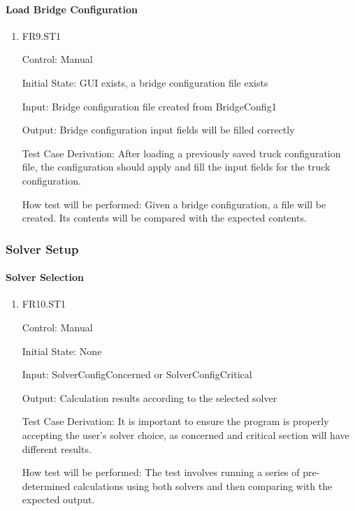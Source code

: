 \documentclass[12pt, titlepage]{article}
\begin{document}
\paragraph{Load Bridge Configuration}

\begin{enumerate}
  
  \item{FR9.ST1\\}
  
  Control: Manual
  
  Initial State: GUI exists, a bridge configuration file exists
  
  Input: Bridge configuration file created from BridgeConfig1
  
  Output: Bridge configuration input fields will be filled correctly
  
  Test Case Derivation: After loading a previously saved truck configuration file, the configuration
  should apply and fill the input fields for the truck configuration.
  
  How test will be performed: Given a bridge configuration, a file will be created. Its contents
  will be compared with the expected contents.

\end{enumerate}

\subsubsection{Solver Setup}

\paragraph{Solver Selection}

\begin{enumerate}

  \item{FR10.ST1\\}

  Control: Manual
            
  Initial State: None
            
  Input: SolverConfigConcerned or SolverConfigCritical
            
  Output: Calculation results according to the selected solver

  Test Case Derivation: It is important to ensure the program is properly accepting the user's solver choice, as concerned and critical section will have different results.

  How test will be performed: The test involves running a series of pre-determined calculations using both solvers and then comparing with the expected output. 
					
\end{enumerate}
\end{document}
